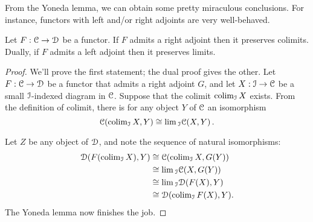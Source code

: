 From the Yoneda lemma, we can obtain some pretty miraculous conclusions.
For instance, functors with left and/or right adjoints are very well-behaved.
\begin{theorem}\label{adjointslimits}
    Let $F:\mathcal C\to\mathcal D$ be a functor.
    If $F$ admits a right adjoint then it preserves colimits.
    Dually, if $F$ admits a left adjoint then it preserves limits.
\end{theorem}
\begin{proof}
    We'll prove the first statement; the dual proof gives the other.
    Let $F:\mathcal C\to\mathcal D$ be a functor that admits a right adjoint $G$, and let $X:\mathcal I\to\mathcal C$ be a
    small $\mathcal I$-indexed diagram in $\mathcal C$. Suppose that the colimit 
$\operatorname{colim}_{\mathcal I}X$ exists. From the definition of colimit, there is
    for any object $Y$ of $\mathcal C$ an isomorphism
$$
\mathcal C(\operatorname{colim}_{\mathcal I} X, Y) \cong \lim{}_{\mathcal I}\mathcal C(X, Y)\,.
$$
   
    Let $Z$ be any object of $\mathcal D$, and note the sequence of natural 
isomorphisms:
    \begin{align*}
	\mathcal D(F(\operatorname{colim}_{\mathcal I} X), Y) & \cong \mathcal C(\operatorname{colim}_{\mathcal I} X, G(Y))\\
	& \cong \lim{}_{\mathcal I}\mathcal C(X, G(Y))\\
	& \cong \lim{}_{\mathcal I}\mathcal D(F(X), Y)\\
	& \cong \mathcal D(\operatorname{colim}_{\mathcal I}F(X), Y).
    \end{align*}
    The Yoneda lemma now finishes the job.
\end{proof}
